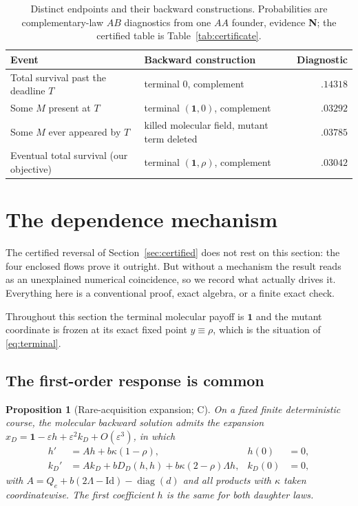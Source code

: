 \documentclass[11pt]{article}
\newtheorem{proposition}[theorem]{Proposition}
\theoremstyle{remark}
\newcommand{\one}{\mathbf 1}
\newcommand{\diag}{\operatorname{diag}}
\newcommand{\eps}{\varepsilon}
\newcommand{\Id}{\mathrm{Id}}
\begin{document}
\begin{table}[ht]
\centering\small
\caption{Distinct endpoints and their backward constructions. Probabilities are
complementary-law $AB$ diagnostics from one $AA$ founder, evidence \textbf{N};
the certified table is Table~\ref{tab:certificate}.}
\label{tab:events}
\begin{tabular}{llr}\toprule
Event&Backward construction&Diagnostic\\\midrule
Total survival past the deadline $T$&terminal $0$, complement&$.14318$\\
Some $M$ present at $T$&terminal $(\one,0)$, complement&$.03292$\\
Some $M$ ever appeared by $T$&killed molecular field, mutant term deleted&$.03785$\\
Eventual total survival (our objective)&terminal $(\one,\rho)$, complement&$.03042$\\
\bottomrule
\end{tabular}
\end{table}

\section{The dependence mechanism}\label{sec:mechanism}

The certified reversal of Section~\ref{sec:certified} does not rest on this
section: the four enclosed flows prove it outright. But without a mechanism the
result reads as an unexplained numerical coincidence, so we record what actually
drives it. Everything here is a conventional proof, exact algebra, or a finite
exact check.

Throughout this section the terminal molecular payoff is $\one$ and the mutant
coordinate is frozen at its exact fixed point $y\equiv\rho$, which is the
situation of \eqref{eq:terminal}.

\subsection{The first-order response is common}
\begin{proposition}[Rare-acquisition expansion; C]\label{prop:expansion}
On a fixed finite deterministic course, the molecular backward solution admits
the expansion $x_D=\one-\eps h+\eps^2k_D+O(\eps^3)$, in which
\begin{align}
 h'&=Ah+b\kappa(1-\rho),&h(0)&=0,\label{eq:h}\\
 k_D'&=Ak_D+bD_D(h,h)+b\kappa(2-\rho)\Lambda h,&k_D(0)&=0,\label{eq:k}
\end{align}
with $A=Q_e+b(2\Lambda-\Id)-\diag(d)$ and all products with $\kappa$ taken
coordinatewise. The first coefficient $h$ is the same for both daughter laws.
\end{proposition}
\end{document}
